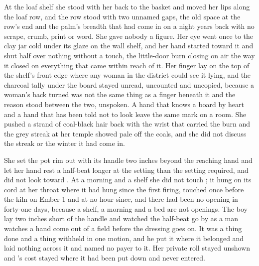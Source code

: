 At the loaf shelf she stood with her back to the basket and moved her lips along the loaf row, and the row stood with two unnamed gaps, the old space at the row's end and the palm's breadth that had come in on a night years back with no scrape, crumb, print or word. She gave nobody a figure. Her eye went once to the clay jar cold under its glaze on the wall shelf, and her hand started toward it and shut half over nothing without a touch, the little-door burn closing on air the way it closed on everything that came within reach of it. Her finger lay on the top of the shelf's front edge where any woman in the district could see it lying, and the charcoal tally under the board stayed unread, uncounted and uncopied, because a woman's back turned was not the same thing as a finger beneath it and the reason stood between the two, unspoken. A hand that knows a board by heart and a hand that has been told not to look leave the same mark on a room. She pushed a strand of coal-black hair back with the wrist that carried the burn and the grey streak at her temple showed pale off the coals, and she did not discuss the streak or the winter it had come in.

She set the pot rim out with its handle two inches beyond the reaching hand and let her hand rest a half-beat longer at the setting than the setting required, and did not look toward . At a morning and a shelf she did not touch ; it hung on its cord at her throat where it had hung since the first firing, touched once before the kiln on Ember 1 and at no hour since, and there had been no opening in forty-one days, because a shelf, a morning and a bed are not openings. The boy lay two inches short of the handle and watched the half-beat go by as a man watches a hand come out of a field before the dressing goes on. It was a thing done and a thing withheld in one motion, and he put it where it belonged and laid nothing across it and named no payer to it. Her private roll stayed unshown and 's cost stayed where it had been put down and never entered.

